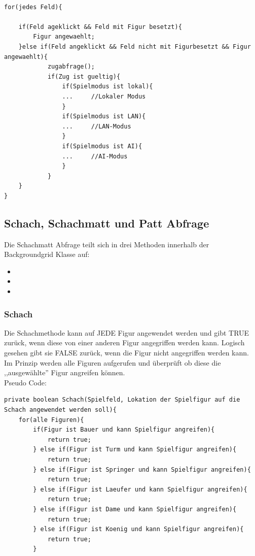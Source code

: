 \documentclass[12pt,a4paper]{article}
\begin{document}
{\lstset{language=java}
\begin{lstlisting}

for(jedes Feld){

	if(Feld ageklickt && Feld mit Figur besetzt){
		Figur angewaehlt;
	}else if(Feld angeklickt && Feld nicht mit Figurbesetzt && Figur angewaehlt){
			zugabfrage();
			if(Zug ist gueltig){
				if(Spielmodus ist lokal){
				... 	//Lokaler Modus
				}
				if(Spielmodus ist LAN){
				...		//LAN-Modus
				}
				if(Spielmodus ist AI){
				...		//AI-Modus
				}
			}	
	}
}

\end{lstlisting}

\subsection{Schach, Schachmatt und Patt Abfrage}
\label{SUBSEC:checkmate}

Die Schachmatt Abfrage teilt sich in drei Methoden innerhalb der Backgroundgrid Klasse auf:
\begin{itemize}
	\item{}
	\item{}
	\item{}
\end{itemize}



\subsubsection{Schach}
\label{SUBSUBSEC:check}

Die Schachmethode kann auf JEDE Figur angewendet werden und gibt TRUE zurück, wenn diese von einer anderen Figur angegriffen werden kann. Logisch gesehen gibt sie FALSE zurück, wenn die Figur nicht angegriffen werden kann. \\
Im Prinzip werden alle Figuren aufgerufen und überprüft ob diese die ,,ausgewählte'' Figur angreifen können. \\
Pseudo Code:

\lstset{language=Java}
\begin{lstlisting}
private boolean Schach(Spielfeld, Lokation der Spielfigur auf die Schach angewendet werden soll){
	for(alle Figuren){
		if(Figur ist Bauer und kann Spielfigur angreifen){
			return true;		
		} else if(Figur ist Turm und kann Spielfigur angreifen){
			return true;
		} else if(Figur ist Springer und kann Spielfigur angreifen){
			return true;
		} else if(Figur ist Laeufer und kann Spielfigur angreifen){
			return true;
		} else if(Figur ist Dame und kann Spielfigur angreifen){
			return true;
		} else if(Figur ist Koenig und kann Spielfigur angreifen){
			return true;
		}
		

\end{lstlisting}}
\end{document}
